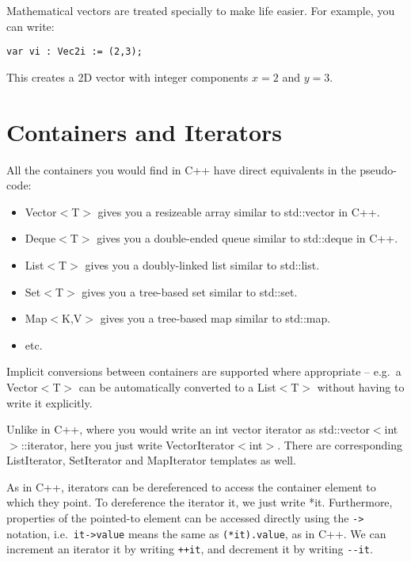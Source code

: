 Mathematical vectors are treated specially to make life easier. For example, you can write:
%
\begin{lstlisting}[style=Snippet]
var vi : Vec2i := (2,3);
\end{lstlisting}
%
This creates a 2D vector with integer components $x = 2$ and $y = 3$.

\section{Containers and Iterators}

All the containers you would find in C++ have direct equivalents in the pseudo-code:
%
\begin{itemize}
\item Vector$<$T$>$ gives you a resizeable array similar to std::vector in C++.
\item Deque$<$T$>$ gives you a double-ended queue similar to std::deque in C++.
\item List$<$T$>$ gives you a doubly-linked list similar to std::list.
\item Set$<$T$>$ gives you a tree-based set similar to std::set.
\item Map$<$K,V$>$ gives you a tree-based map similar to std::map.
\item etc.
\end{itemize}
%
Implicit conversions between containers are supported where appropriate -- e.g.~a Vector$<$T$>$ can be automatically converted to a List$<$T$>$ without having to write it explicitly.

Unlike in C++, where you would write an int vector iterator as std::vector$<$int$>$::iterator, here you just write VectorIterator$<$int$>$. There are corresponding ListIterator, SetIterator and MapIterator templates as well.

As in C++, iterators can be dereferenced to access the container element to which they point. To dereference the iterator it, we just write *it. Furthermore, properties of the pointed-to element can be accessed directly using the \lstinline[language=Pseudocode]$->$ notation, i.e.~\lstinline[language=Pseudocode]$it->value$ means the same as \lstinline[language=Pseudocode]$(*it).value$, as in C++. We can increment an iterator it by writing \lstinline[language=Pseudocode]$++it$, and decrement it by writing \lstinline[language=Pseudocode]$--it$.

